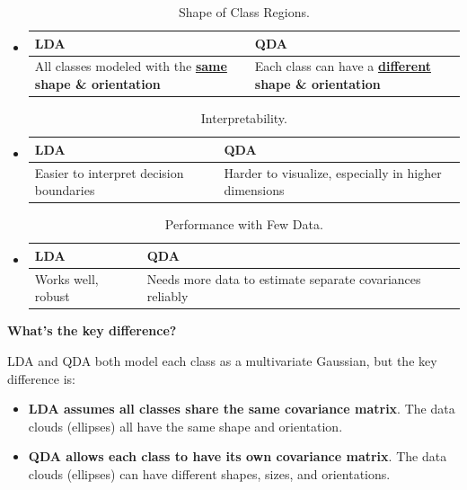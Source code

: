 \begin{itemize}
    \item {}
    \begin{table}[!htp]
        \centering
        \begin{tabular}{@{} p{16.6em} | p{16.6em} @{}}
            \toprule
            LDA & QDA \\
            \midrule
            All classes modeled with the \textbf{\underline{same} shape \& orientation} & Each class can have a \textbf{\underline{different} shape \& orientation} \\
            \bottomrule
        \end{tabular}
        \caption*{Shape of Class Regions.}
    \end{table}

    \newpage

    \item {}
    \begin{table}[!htp]
        \centering
        \begin{tabular}{@{} p{15em} | p{15em} @{}}
            \toprule
            LDA & QDA \\
            \midrule
            Easier to interpret decision boundaries & Harder to visualize, especially in higher dimensions \\
            \bottomrule
        \end{tabular}
        \caption*{Interpretability.}
    \end{table}

    \item {}
    \begin{table}[!htp]
        \centering
        \begin{tabular}{@{} l | p{18em} @{}}
            \toprule
            LDA & QDA \\
            \midrule
            Works well, robust & Needs more data to estimate separate covariances reliably \\
            \bottomrule
        \end{tabular}
        \caption*{Performance with Few Data.}
    \end{table}
\end{itemize}

\begin{flushleft}
    \textcolor{Green3}{ \textbf{What's the key difference?}}
\end{flushleft}
LDA and QDA both model each class as a multivariate Gaussian, but the key difference is:
\begin{itemize}
    \item \textbf{LDA assumes all classes share the same covariance matrix}. The data clouds (ellipses) all have the same shape and orientation.
    \item \textbf{QDA allows each class to have its own covariance matrix}. The data clouds (ellipses) can have different shapes, sizes, and orientations.
\end{itemize}

